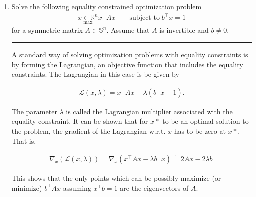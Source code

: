 \documentclass[12pt]{article}
\begin{document}
\begin{enumerate}
    \item Solve the following equality constrained optimization problem
    \begin{align*}
        \underset{\textrm{max}}{x \in \mathbb{R}^n} x^\intercal Ax \qquad \textrm{subject to} \; b^\intercal x=1
    \end{align*}
    for a symmetric matrix $A \in \mathbb{S}^n $. Assume that $A$ is invertible and $b \neq 0$. 

    \noindent\rule{\linewidth}{1pt}

    A standard way of solving optimization problems with equality constraints is by
    forming the Lagrangian, an objective function that includes the equality constraints.
    The Lagrangian in this case is be given by

    \begin{align*}
        \mathcal{L}(x, \lambda) = x^\intercal Ax - \lambda(b^\intercal x - 1).
    \end{align*}

    The parameter $\lambda$ is called the Lagrangian multiplier associated with the equality
    constraint. It can be shown that for $x*$ to be an optimal solution to the problem,
    the gradient of the Lagrangian w.r.t. $x$ has to be zero at $x*$. That is,

    \begin{align*}
        \nabla_x (\mathcal{L}(x, \lambda)) = \nabla_x (x^\intercal Ax - \lambda b^\intercal x) \overset{!}{=} 2Ax - 2\lambda b \
    \end{align*}
    
    This shows that the only points which can be possibly maximize (or minimize)
    $b^\intercal Ax$ assuming $x^\intercal b = 1$ are the eigenvectors of $A$.

\end{enumerate}
\end{document}
